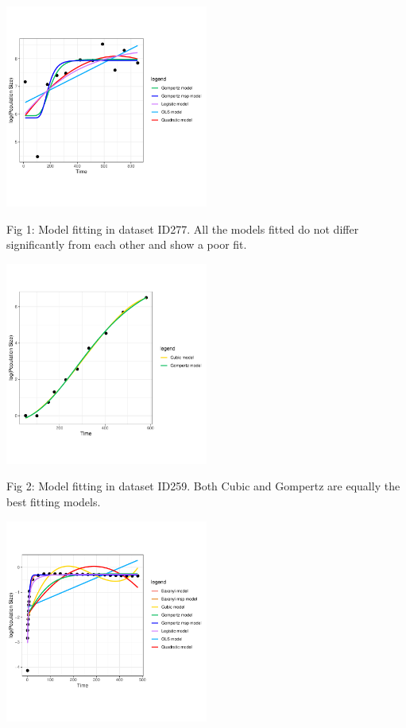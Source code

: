 \documentclass[11pt]{article}
\begin{document}
\vspace{\baselineskip}

\includegraphics[width=0.5\textwidth]{../results/ID277.pdf}


{\footnotesize Fig 1: Model fitting in dataset ID277. All the models fitted do not differ significantly from each other and show a poor fit. }

\vspace{\baselineskip}

\includegraphics[width=0.5\textwidth]{../results/ID259.pdf}


{\footnotesize Fig 2: Model fitting in dataset ID259. Both Cubic and Gompertz are equally the best fitting models.  }

\vspace{\baselineskip}

\includegraphics[width=0.5\textwidth]{../results/ID131.pdf}
\end{document}
